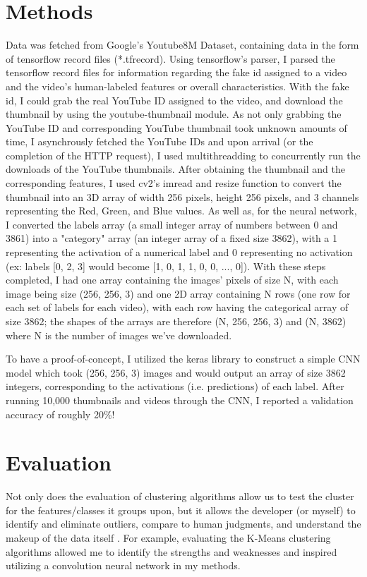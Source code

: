 \documentclass[10pt,twocolumn]{article}
\begin{document}
\section {Methods}

Data was fetched from Google's Youtube8M Dataset, containing data in the form of tensorflow record files (*.tfrecord). Using tensorflow's parser, I parsed the tensorflow record files for information regarding the fake id assigned to a video and the video's human-labeled features or overall characteristics. With the fake id, I could grab the real YouTube ID assigned to the video, and download the thumbnail by using the youtube-thumbnail module. As not only grabbing the YouTube ID and corresponding YouTube thumbnail took unknown amounts of time, I asynchrously fetched the YouTube IDs and upon arrival (or the completion of the HTTP request), I used multithreadding to concurrently run the downloads of the YouTube thumbnails. After obtaining the thumbnail and the corresponding features, I used cv2's imread and resize function to convert the thumbnail into an 3D array of width 256 pixels, height 256 pixels, and 3 channels representing the Red, Green, and Blue values. As well as, for the neural network, I converted the labels array (a small integer array of numbers between 0 and 3861) into a "category" array (an integer array of a fixed size 3862), with a 1 representing the activation of a numerical label and 0 representing no activation (ex: labels [0, 2, 3] would become [1, 0, 1, 1, 0, 0, ..., 0]). With these steps completed, I had one array containing the images' pixels of size N, with each image being size (256, 256, 3) and one 2D array containing N rows (one row for each set of labels for each video), with each row having the categorical array of size 3862; the shapes of the arrays are therefore (N, 256, 256, 3) and (N, 3862) where N is the number of images we've downloaded.

To have a proof-of-concept, I utilized the keras library to construct a simple CNN model which took (256, 256, 3) images and would output an array of size 3862 integers, corresponding to the activations (i.e. predictions) of each label. After running 10,000 thumbnails and videos through the CNN, I reported a validation accuracy of roughly 20\%!


\section{Evaluation}

Not only does the evaluation of clustering algorithms allow us to test the cluster for the features/classes it groups upon, but it allows the developer (or myself) to identify and eliminate outliers, compare to human judgments, and understand the makeup of the data itself \cite{Lavrenko2014}. For example, evaluating the K-Means clustering algorithms allowed me to identify the strengths and weaknesses and inspired utilizing a convolution neural network in my methods.
\end{document}
